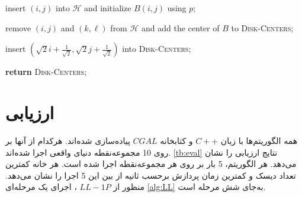 \documentclass[12pt]{article}
\begin{document}
\begin{algorithm}[H]
\begin{latin}
\begin{algorithmic}[1]
		\ELSE 
		\STATE insert $(i,j)$ into $\mathcal{H}$ and initialize $B(i,j)$ using $p$;

		\ENDIF
		\ENDFOR

		\STATE remove $(i,j)$ and $(k,\ell)$ from $\mathcal{H}$ and 
	 add the center of $B$ to \textsc{Disk-Centers};
		\ENDIF
		\ENDWHILE
		
		\STATE insert $(\sqrt{2}i + \frac{1}{\sqrt{2}}, \sqrt{2}j + \frac{1}{\sqrt{2}})$ into \textsc{Disk-Centers};
		\ENDFOR
		
		\STATE \textbf{return} \textsc{Disk-Centers};
	\end{algorithmic}
\end{latin}
\end{algorithm}



\section{ارزیابی}

همه الگوریتم‌ها با زبان $C++$ و کتابخانه $CGAL$ پیاده‌سازی شده‌اند. هرکدام از آنها بر روی 10 مجموعه‌نقطه دنیای واقعی اجرا شده‌اند.
\cref{tb:eval}
نتایج ارزیابی را نشان می‌دهد. هر الگوریتم، 5 بار بر روی هر مجموعه‌نقطه اجرا شده است. هر خانه کمترین تعداد دیسک و کمترین زمان پردازش برحسب ثانیه از بین این 5 اجرا را نشان می‌دهد. منظور از $LL-1P$ ، اجرای یک مرحله‌ای
\cref{alg:LL}
به‌جای شش مرحله است.
\end{document}
